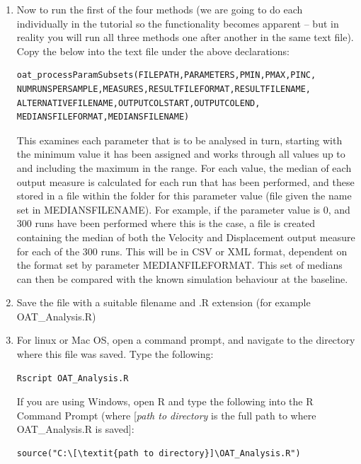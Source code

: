 \documentclass[a4paper,11pt]{article}
\begin{document}
\begin{enumerate}
\begin{verbatim}
\end{verbatim}

\item Now to run the first of the four methods (we are going to do each individually in the tutorial so the functionality becomes apparent – but in reality you will run all three methods one after another in the same text file). Copy the below into the text file under the above declarations:

\begin{verbatim}
oat_processParamSubsets(FILEPATH,PARAMETERS,PMIN,PMAX,PINC,
NUMRUNSPERSAMPLE,MEASURES,RESULTFILEFORMAT,RESULTFILENAME,
ALTERNATIVEFILENAME,OUTPUTCOLSTART,OUTPUTCOLEND,
MEDIANSFILEFORMAT,MEDIANSFILENAME)
\end{verbatim}

This examines each parameter that is to be analysed in turn, starting with the minimum value it has been assigned and works through all values up to and including the maximum in the range.  For each value, the median of each output measure is calculated for each run that has been performed, and these stored in a file within the folder for this parameter value (file given the name set in MEDIANSFILENAME). For example, if the parameter value is 0, and 300 runs have been performed where this is the case, a file is created containing the median of both the Velocity and Displacement output measure for each of the 300 runs. This will be in CSV or XML format, dependent on the format set by parameter MEDIANFILEFORMAT. This set of medians can then be compared with the known simulation behaviour at the baseline.

\item Save the file with a suitable filename and .R extension (for example OAT\_Analysis.R)
\item For linux or Mac OS, open a command prompt, and navigate to the directory where this file was saved.  Type the following:

\begin{verbatim}
Rscript OAT_Analysis.R
\end{verbatim}

If you are using Windows, open R and type the following into the R Command Prompt (where [\textit{path to directory} is the full path to where OAT\_Analysis.R is saved]:

\begin{verbatim}
source("C:\[\textit{path to directory}]\OAT_Analysis.R")
\end{verbatim}


\end{enumerate}
\end{document}
